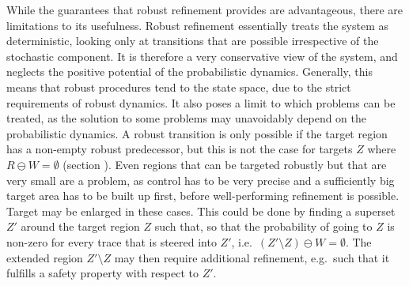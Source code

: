 \stopsubsection


\startsubsection[title={Limitations of Robust Refinement},reference=sec:refinement-robust-limitations]

    While the guarantees that robust refinement provides are advantageous, there are limitations to its usefulness.
    Robust refinement essentially treats the system as deterministic, looking only at transitions that are possible irrespective of the stochastic component.
    It is therefore a very conservative view of the system, and neglects the positive potential of the probabilistic dynamics.
    Generally, this means that robust procedures tend to  the state space, due to the strict requirements of robust dynamics.
    It also poses a limit to which problems can be treated, as the solution to some problems may unavoidably depend on the probabilistic dynamics.
    A robust transition is only possible if the target region has a non-empty robust predecessor, but this is not the case for targets $Z$ where $R \ominus W = \emptyset$ (section ).
    Even regions that can be targeted robustly but that are very small are a problem, as control has to be very precise and a sufficiently big target area has to be built up first, before well-performing refinement is possible.
    Target may be enlarged in these cases.
    This could be done by finding a superset $Z'$ around the target region $Z$ such that, so that the probability of going to $Z$ is non-zero for every trace that is steered into $Z'$, i.e.\ $(Z' \setminus Z) \ominus W = \emptyset$.
    The extended region $Z' \setminus Z$ may then require additional refinement, e.g.\ such that it fulfills a safety property with respect to $Z'$.

\stopsubsection

